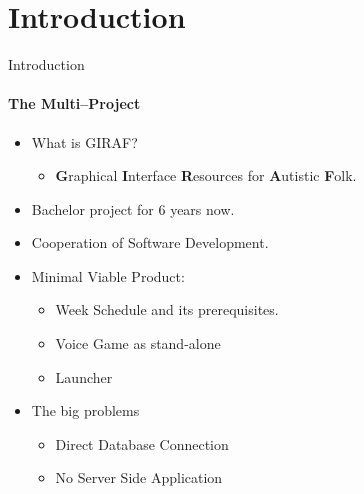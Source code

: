 \section{Introduction}
    \begin{frame}[t]{Introduction}\framesubtitle{The Multi--Project}
        \begin{itemize}
	        \item What is GIRAF?
	        	\begin{itemize}
	        		\item \textbf{G}raphical \textbf{I}nterface \textbf{R}esources for \textbf{A}utistic \textbf{F}olk.
	        	\end{itemize}
        	\item Bachelor project for 6 years now.
        	\item Cooperation of Software Development.
        	\item Minimal Viable Product:
        		\begin{itemize}
        			\item Week Schedule and its prerequisites.
        			\item Voice Game as stand-alone
        			\item Launcher 
        		\end{itemize}
    		\item The big problems
    		\begin{itemize}
    			\item Direct Database Connection
    			\item No Server Side Application
    		\end{itemize}
        \end{itemize}
    \end{frame}

